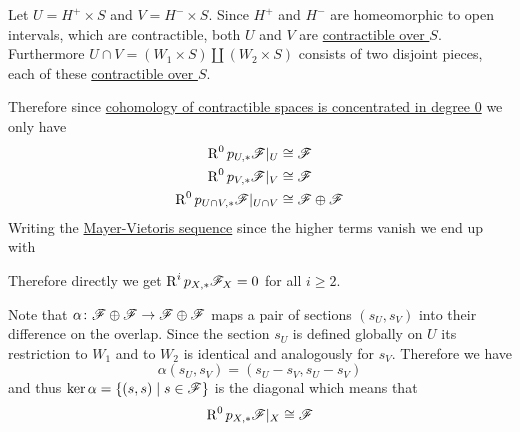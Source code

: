 \documentclass[../../main]{subfiles}
\begin{document}
\begin{example}[\(\mathbb{S}^{1}\)]
  Let \(U = H^{+} \times S\) and \(V = H^{-} \times S\).
  Since \(H^{+}\) and \(H^{-}\) are homeomorphic to open intervals, which are contractible, both \(U\) and \(V\) are \hyperref[def:homotopy-over]{contractible over \(S\)}.
  Furthermore \(U \cap V = \left( W_{1} \times S \right) \coprod \left( W_{2} \times S \right)\) consists of two disjoint pieces, each of these \hyperref[def:homotopy-over]{contractible over \(S\)}.

  Therefore since \hyperref[cor:cohomology-and-contractible]{cohomology of contractible spaces is concentrated in degree 0} we only have
  \begin{align*}
    \operatorname{R}^{0} p_{U, \ast}\mathscr{F}|_{U} &\cong \mathscr{F} \\
    \operatorname{R}^{0}p_{V, \ast}\mathscr{F}|_{V} &\cong \mathscr{F} \\
    \operatorname{R}^{0}p_{U \cap V, \ast} \mathscr{F}|_{U \cap V} &\cong \mathscr{F} \oplus \mathscr{F}
  \end{align*}
  Writing the \hyperref[thm:mayer-vietoris-open]{Mayer-Vietoris sequence} since the higher terms vanish we end up with
  \begin{center}
  \end{center}
  Therefore directly we get \(\operatorname{R}^{i}p_{X, \ast}\mathscr{F}_{X} = 0\) for all \(i \geq 2\).

  Note that \(\alpha\colon \mathscr{F} \oplus \mathscr{F} \to \mathscr{F} \oplus \mathscr{F}\) maps a pair of sections \((s_{U}, s_{V})\) into their difference on the overlap.
  Since the section \(s_{U}\) is defined globally on \(U\) its restriction to \(W_{1}\) and to \(W_{2}\) is identical and analogously for \(s_{V}\).
  Therefore we have
  \begin{equation*}
    \alpha(s_{U}, s_{V}) = (s_{U} - s_{V}, s_{U} - s_{V})
  \end{equation*}
  and thus \(\ker \alpha = \{(s, s) \mid s \in \mathscr{F}\}\) is the diagonal which means that
  \begin{equation*}
    \operatorname{R}^{0}p_{X, \ast} \mathscr{F}|_{X} \cong \mathscr{F}
  \end{equation*}


\end{example}
\end{document}
